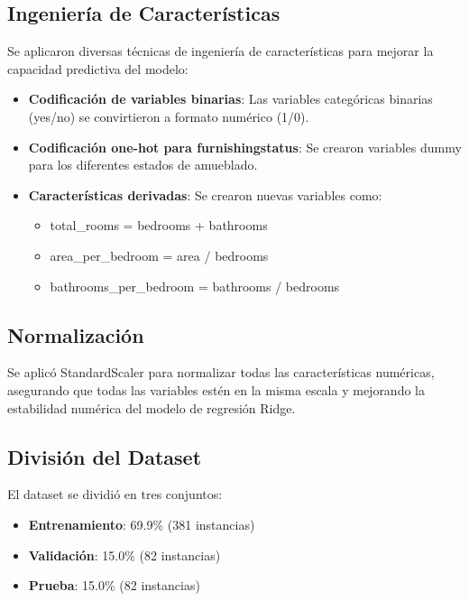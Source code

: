 \documentclass[11pt,a4paper]{article}
\begin{document}
\subsection{Ingeniería de Características}

Se aplicaron diversas técnicas de ingeniería de características para mejorar la capacidad predictiva del modelo:

\begin{itemize}
    \item \textbf{Codificación de variables binarias}: Las variables categóricas binarias (yes/no) se convirtieron a formato numérico (1/0).
    \item \textbf{Codificación one-hot para furnishingstatus}: Se crearon variables dummy para los diferentes estados de amueblado.
    \item \textbf{Características derivadas}: Se crearon nuevas variables como:
    \begin{itemize}
        \item total\_rooms = bedrooms + bathrooms
        \item area\_per\_bedroom = area / bedrooms
        \item bathrooms\_per\_bedroom = bathrooms / bedrooms
    \end{itemize}
\end{itemize}

\subsection{Normalización}

Se aplicó StandardScaler para normalizar todas las características numéricas, asegurando que todas las variables estén en la misma escala y mejorando la estabilidad numérica del modelo de regresión Ridge.

\subsection{División del Dataset}

El dataset se dividió en tres conjuntos:
\begin{itemize}
    \item \textbf{Entrenamiento}: 69.9\% (381 instancias)
    \item \textbf{Validación}: 15.0\% (82 instancias)
    \item \textbf{Prueba}: 15.0\% (82 instancias)
\end{itemize}
\end{document}

